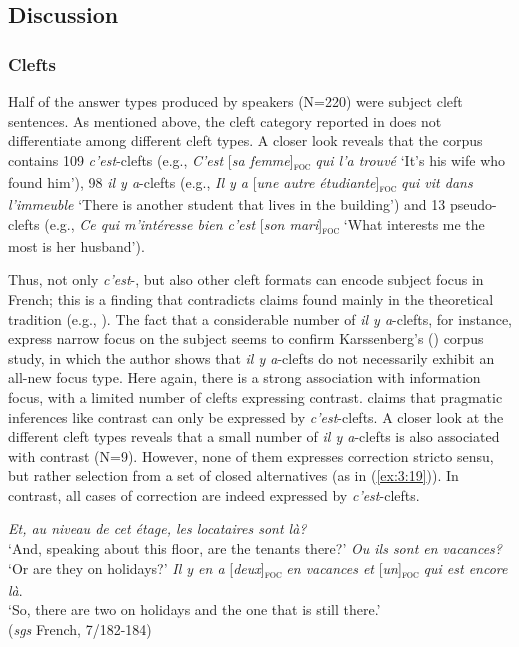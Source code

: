 {\subsection{Discussion} \label{sub:4.6.1}
\subsubsection{Clefts} \label{sub:4.6.1.1}

Half of the answer types produced by speakers (N=220) were subject cleft sentences. As mentioned above, the cleft category reported in  does not differentiate among different cleft types. A closer look reveals that the corpus contains 109 \textit{c'est}-clefts (e.g., \textit{C'est} [\textit{sa femme}]\textsubscript{\textsc{foc}} \normalsize \textit{qui l'a trouvé} `It's his wife who found him'), 98 \textit{il y a}-clefts (e.g., \textit{Il y a} [\textit{\textit{une autre étudiante}}]\textsubscript{\textsc{foc}} \normalsize \textit{qui vit dans l'immeuble} `There is another student that lives in the building') and 13 pseudo-clefts (e.g., \textit{Ce qui m'intéresse bien c'est} [\textit{s\textit{on mari}}]\textsubscript{\textsc{foc}} \normalsize `What interests me the most is her husband').

Thus, not only \textit{c'est}-, but also other cleft formats can encode subject focus in French; this is a finding that contradicts claims found mainly in the theoretical tradition (e.g., \cite{lambrecht1996information}).
The fact that a considerable number of \textit{il y a}-clefts, for instance, express narrow focus on the subject seems to confirm Karssenberg's (\citeyear{karssenberg2017oiseaux}) corpus study, in which the author shows that \textit{il y a}-clefts do not necessarily exhibit an all-new focus type. 
Here again, there is a strong association with information focus, with a limited number of clefts expressing contrast. \textcite{lambrecht1996information} claims that pragmatic inferences like contrast can only be expressed by \textit{c'est}-clefts. A closer look at the different cleft types reveals that a small number of \textit{il y a}-clefts is also associated with contrast (N=9). However, none of them expresses correction stricto sensu, but rather selection from a set of closed alternatives (as in (\ref{ex:3:19})). In contrast, all cases of correction are indeed expressed by \textit{c'est}-clefts.

 \ea \label{ex:3:19}
\ea	\textit{Et, au niveau de cet étage, les locataires sont là?}\\
 ‘And, speaking about this floor, are the tenants there?'
  \textit{Ou ils sont en vacances?}\\
 ‘Or are they on holidays?'
\ex \textit{Il y en a} {[\textit{deux}]\textsubscript{\textsc{foc}}} \normalsize \textit{en vacances et} {[\textit{un}]\textsubscript{\textsc{foc}}}  \textit{qui est encore là}.  \\
‘So, there are two on holidays and the one that is still there.' \\
\hfill (\textit{sgs} French, 7/182-184)    
\z \z 


}
